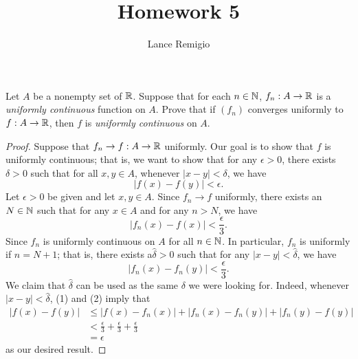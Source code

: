 \documentclass[a4paper]{article}
\title{Homework 5}
\author{Lance Remigio}
\begin{document}
\maketitle

\begin{problem}
    Let \( A  \) be a nonempty set of \( \mathbb{R}  \). Suppose that for each \( n \in \mathbb{N} \), \( {f}_{n} : A \to \mathbb{R}  \) is a \textit{uniformly continuous} function on \( A  \). Prove that if \( ({f}_{n})  \) converges uniformly to \( f: A \to \mathbb{R}  \), then \( f  \) is \textit{uniformly continuous} on \( A  \).
\end{problem}
\begin{proof}
Suppose that \( {f}_{n} \to f: A \to \mathbb{R}   \) uniformly. Our goal is to show that \( f  \) is uniformly continuous; that is, we want to show that for any \( \epsilon > 0  \), there exists \( \delta > 0  \) such that for all \( x,y \in A  \), whenever \( | x - y  | < \delta \), we have 
\[  | f(x) - f(y) | < \epsilon. \]
Let \( \epsilon > 0  \) be given and let \( x,y \in A  \). Since \( {f}_{n} \to f  \) uniformly, there exists an \( N \in \mathbb{N}  \) such that for any \( x  \in A \) and for any \( n > N  \), we have 
\[  | {f}_{n}(x) - f(x) |  < \frac{ \epsilon }{ 3 }. \tag{1} \]
Since \( {f}_{n} \) is uniformly continuous on \( A  \) for all \( n \in \mathbb{N} \). In particular, \( {f}_{n} \) is uniformly if \( n = N + 1 \); that is, there exists a\( \hat{\delta} > 0 \) such that for any \( | x - y  |  < \hat{\delta}  \), we have
\[  | {f}_{n}(x) - {f}_{n}(y) |  < \frac{ \epsilon }{ 3 }. \tag{2}  \]
We claim that \( \hat{\delta} \) can be used as the same \( \delta  \) we were looking for. Indeed, whenever \( | x -y  |  < \hat{\delta} \), (1) and (2) imply that
\begin{align*}
    | f(x) - f(y)  | &\leq | f(x) - {f}_{n}(x) | + | {f}_{n}(x) - {f}_{n}(y) |  + | {f}_{n}(y) - f(y) |  \\
                     &< \frac{ \epsilon }{ 3 }  + \frac{ \epsilon }{ 3 }  + \frac{ \epsilon }{ 3 }  \\
                     &= \epsilon
\end{align*}
as our desired result.
\end{proof}
\end{document}
